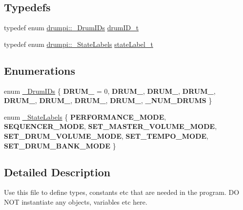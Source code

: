 \subsection*{Typedefs}
\begin{DoxyCompactItemize}
\item 
typedef enum \hyperlink{namespacedrumpi_ae52c777732de9715bae5bf0dfb40c650}{drumpi\+::\+\_\+\+Drum\+I\+Ds} \hyperlink{namespacedrumpi_a3897274035c1b939a604438abe648b1b}{drum\+I\+D\+\_\+t}
\item 
typedef enum \hyperlink{namespacedrumpi_a3b4ebb11c78873766e337e65d6597286}{drumpi\+::\+\_\+\+State\+Labels} \hyperlink{namespacedrumpi_af70ab0854d65f24f7fa353fdc1c46bc9}{state\+Label\+\_\+t}
\end{DoxyCompactItemize}
\subsection*{Enumerations}
\begin{DoxyCompactItemize}
\item 
enum \hyperlink{namespacedrumpi_ae52c777732de9715bae5bf0dfb40c650}{\+\_\+\+Drum\+I\+Ds} \{ \newline
{\bfseries D\+R\+U\+M\+\_} = 0, 
{\bfseries D\+R\+U\+M\+\_}, 
{\bfseries D\+R\+U\+M\+\_}, 
{\bfseries D\+R\+U\+M\+\_}, 
\newline
{\bfseries D\+R\+U\+M\+\_}, 
{\bfseries D\+R\+U\+M\+\_}, 
{\bfseries D\+R\+U\+M\+\_}, 
{\bfseries D\+R\+U\+M\+\_}, 
\newline
{\bfseries \+\_\+\+N\+U\+M\+\_\+\+D\+R\+U\+MS}
 \}
\item 
enum \hyperlink{namespacedrumpi_a3b4ebb11c78873766e337e65d6597286}{\+\_\+\+State\+Labels} \{ \newline
{\bfseries P\+E\+R\+F\+O\+R\+M\+A\+N\+C\+E\+\_\+\+M\+O\+DE}, 
{\bfseries S\+E\+Q\+U\+E\+N\+C\+E\+R\+\_\+\+M\+O\+DE}, 
{\bfseries S\+E\+T\+\_\+\+M\+A\+S\+T\+E\+R\+\_\+\+V\+O\+L\+U\+M\+E\+\_\+\+M\+O\+DE}, 
{\bfseries S\+E\+T\+\_\+\+D\+R\+U\+M\+\_\+\+V\+O\+L\+U\+M\+E\+\_\+\+M\+O\+DE}, 
\newline
{\bfseries S\+E\+T\+\_\+\+T\+E\+M\+P\+O\+\_\+\+M\+O\+DE}, 
{\bfseries S\+E\+T\+\_\+\+D\+R\+U\+M\+\_\+\+B\+A\+N\+K\+\_\+\+M\+O\+DE}
 \}
\end{DoxyCompactItemize}


\subsection{Detailed Description}
Use this file to define types, constants etc that are needed in the program. DO N\+OT instantiate any objects, variables etc here. 

